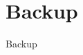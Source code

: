 \documentclass[10 pt,compress,mathserif]{beamer}
\begin{document}
%  


\appendix
{}
\setcounter{finalframe}{\value{framenumber}}

\section{Backup}
\begin{frame}
 \begin{center}
  \begin{LARGE}
   Backup
  \end{LARGE}
 \end{center}
\end{frame}
\end{document}
